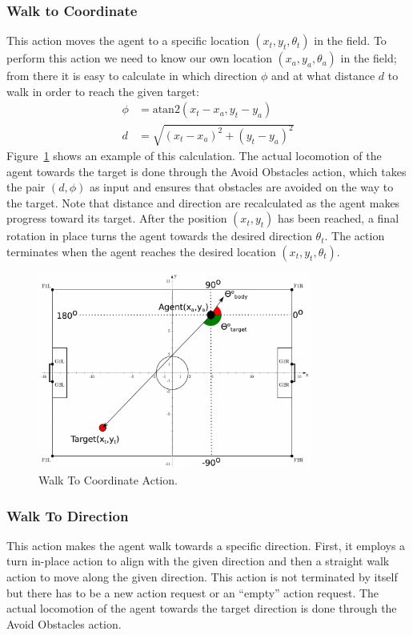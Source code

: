 \subsubsection*{Walk to Coordinate}
This action moves the agent to a specific location $(x_t, y_t, \theta_t)$ in the field. To perform this action we need to know our own location $(x_a, y_a, \theta_a)$ in the field; from there it is easy to calculate in which direction $\phi$ and at what distance $d$ to walk in order to reach the given target:
\begin{align*}
\phi &= \text{atan2}(x_t-x_a,y_t-y_a)\\
d &= \sqrt{(x_t-x_a)^2 + (y_t-y_a)^2}
\end{align*}
Figure~\ref{fig:WalkToCoordinate} shows an example of this calculation. The actual locomotion of the agent towards the target is done through the Avoid Obstacles action, which takes the pair $(d,\phi)$ as input and ensures that obstacles are avoided on the way to the target. Note that distance and direction are recalculated as the agent makes progress toward its target. After the position $(x_t,y_t)$ has been reached, a final rotation in place turns the agent towards the desired direction $\theta_t$. The action terminates when the agent reaches the desired location $(x_t, y_t, \theta_t)$.


 \begin{figure}[t!]
\centering
  \includegraphics[width=0.8\textwidth]{Chapter3/figures/GoToPos.pdf}
  \caption{Walk To Coordinate Action.}
  \label{fig:WalkToCoordinate}
\end{figure}


\subsubsection*{Walk To Direction}
This action makes the agent walk towards a specific direction. First, it employs a turn in-place action to align with the given direction and then a straight walk action to move along the given direction. This action is not terminated by itself but there has to be a new action request or an ``empty'' action request. The actual locomotion of the agent towards the target direction is done through the Avoid Obstacles action.
 
